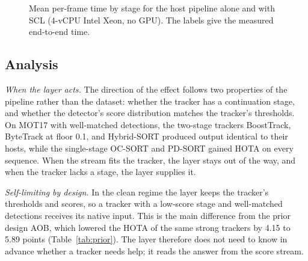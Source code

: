 \documentclass[pdflatex,sn-mathphys-num,iicol]{sn-jnl}
\newcommand{\scl}{SCL}
\newcommand{\aob}{AOB}
\begin{document}
\begin{figure}[t]
\centering
{}
\caption{Mean per-frame time by stage for the host pipeline alone and with
\scl{} (4-vCPU Intel Xeon, no GPU). The labels give the measured
end-to-end time.}
\label{fig:runtime}
\end{figure}
\subsection{Analysis}\label{sec:discussion}

\emph{When the layer acts.} The direction of the effect follows two
properties of the pipeline rather than the dataset: whether the tracker has a
continuation stage, and whether the detector's score distribution matches the
tracker's thresholds. On MOT17 with well-matched detections, the two-stage
trackers BoostTrack, ByteTrack at floor 0.1, and Hybrid-SORT produced output
identical to their hosts, while the single-stage OC-SORT and PD-SORT gained
HOTA on every sequence. When the stream fits the tracker, the layer stays out
of the way, and when the tracker lacks a stage, the layer supplies it.

\emph{Self-limiting by design.} In the clean regime the layer keeps the
tracker's thresholds and scores, so a tracker with a low-score stage and
well-matched detections receives its native input. This is the main
difference from the prior design \aob{}, which lowered the HOTA of the same strong
trackers by 4.15 to 5.89 points (Table~\ref{tab:prior}). The layer therefore does not
need to know in advance whether a tracker needs help; it reads the answer from
the score stream.
\end{document}
